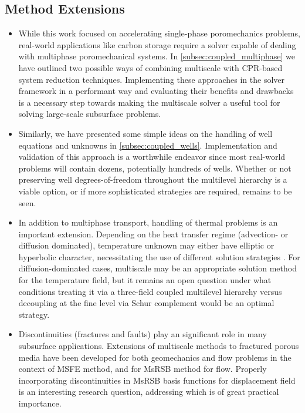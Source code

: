 \subsection{Method Extensions}

\begin{itemize}
  \item While this work focused on accelerating single-phase poromechanics problems, real-world applications like carbon storage require a solver capable of dealing with multiphase poromechanical systems.   In \cref{subsec:coupled_multiphase} we have outlined two possible ways of combining multiscale with CPR-based system reduction techniques.   Implementing these approaches in the solver framework in a performant way and evaluating their benefits and drawbacks is a necessary step towards making the multiscale solver a useful tool for solving large-scale subsurface problems.
  \item Similarly, we have presented some simple ideas on the handling of well equations and unknowns in \cref{subsec:coupled_wells}.   Implementation and validation of this approach is a worthwhile endeavor since most real-world problems will contain dozens, potentially hundreds of wells.   Whether or not preserving well degrees-of-freedom throughout the multilevel hierarchy is a viable option, or if more sophisticated strategies are required, remains to be seen.
  \item In addition to multiphase transport, handling of thermal problems is an important extension.   Depending on the heat transfer regime (advection- or diffusion dominated), temperature unknown may either have elliptic or hyperbolic character, necessitating the use of different solution strategies \cite{Cremon2020}.   For diffusion-dominated cases, multiscale may be an appropriate solution method for the temperature field, but it remains an open question under what conditions treating it via a three-field coupled multilevel hierarchy versus decoupling at the fine level via Schur complement would be an optimal strategy.
  \item Discontinuities (fractures and faults) play an significant role in many subsurface applications.   Extensions of multiscale methods to fractured porous media have been developed for both geomechanics \cite{Levonyan2019} and flow problems \cite{Bosma2017} in the context of MSFE method, and for MsRSB method for flow.   Properly incorporating discontinuities in MsRSB basis functions for displacement field is an interesting research question, addressing which is of great practical importance.
  
\end{itemize}